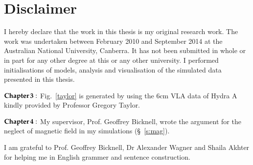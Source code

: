 \section*{Disclaimer}

I hereby declare that the work in this thesis is my original research work. The work was undertaken between February 2010 and September 2014 at the Australian National University, Canberra. It has not been submitted in whole or in part for any other degree at this or any other university. I performed initialisations of  models, analysis and visualisation of the simulated data presented in this thesis. 

$\bf{Chapter\,3:}$ Fig.~\ref{taylor} is generated by using the 6cm VLA data of Hydra A kindly provided by Professor Gregory Taylor. 


$\bf{Chapter\,4:}$ My supervisor, Prof. Geoffrey Bicknell, wrote the argument for the neglect of magnetic field in my simulations (\S~\ref{s:mag}). 

I am grateful to Prof. Geoffrey Bicknell, Dr Alexander Wagner and Shaila Akhter for helping me in English grammer and sentence construction. 

\vspace{1cm}
\begin{flushright}
\fullname

\fullthesisdate
\end{flushright}

